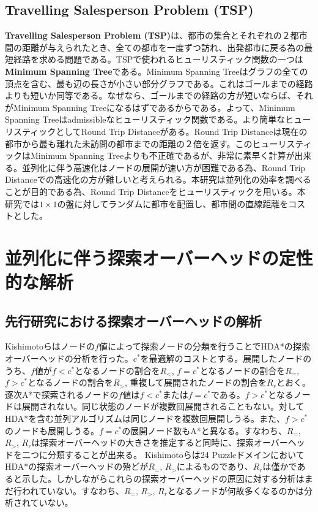 \documentclass[uplatex]{jsarticle}
\begin{document}
\subsection{Travelling Salesperson Problem (TSP)}
\textbf{Travelling Salesperson Problem (TSP)}は、都市の集合とそれぞれの２都市間の距離が与えられたとき、全ての都市を一度ずつ訪れ、出発都市に戻る為の最短経路を求める問題である。TSPで使われるヒューリスティック関数の一つは\textbf{Minimum Spanning Tree}である。Minimum Spanning Treeはグラフの全ての頂点を含む、最も辺の長さが小さい部分グラフである。これはゴールまでの経路よりも短いか同等である。なぜなら、ゴールまでの経路の方が短いならば、それがMinimum Spanning Treeになるはずであるからである。よって、Minimum Spanning Treeはadmissibleなヒューリスティック関数である。より簡単なヒューリスティックとしてRound Trip Distanceがある。Round Trip Distanceは現在の都市から最も離れた未訪問の都市までの距離の２倍を返す。このヒューリスティックはMinimum Spanning Treeよりも不正確であるが、非常に素早く計算が出来る。並列化に伴う高速化はノードの展開が速い方が困難である為、Round Trip Distanceでの高速化の方が難しいと考えられる。本研究は並列化の効率を調べることが目的である為、Round Trip Distanceをヒューリスティックを用いる。本研究では$1\times1$の盤に対してランダムに都市を配置し、都市間の直線距離をコストとした。

\newpage

\section{並列化に伴う探索オーバーヘッドの定性的な解析}
\label{sec:analysis1}

\subsection{先行研究における探索オーバーヘッドの解析}
Kishimotoらはノードの$f$値によって探索ノードの分類を行うことでHDA*の探索オーバーヘッドの分析を行った\cite{Kishimoto2013}。$c^*$を最適解のコストとする。展開したノードのうち、$f$値が$f < c^*$となるノードの割合を$R_{<}$, $f = c^*$となるノードの割合を$R_{=}$, $f > c^*$となるノードの割合を$R_{>}$, 重複して展開されたノードの割合を$R_{r}$とおく。逐次A*で探索されるノードの$f$値は$f < c^*$または$f = c^*$である。$f > c^*$となるノードは展開されない。同じ状態のノードが複数回展開されることもない。対してHDA*を含む並列アルゴリズムは同じノードを複数回展開しうる。また、$f > c^*$のノードも展開しうる。$f = c^*$の展開ノード数もA*と異なる。すなわち、$R_{=}$, $R_{>}$, $R_{r}$は探索オーバーヘッドの大きさを推定すると同時に、探索オーバーヘッドを二つに分類することが出来る。
Kishimotoらは24 PuzzleドメインにおいてHDA*の探索オーバーヘッドの殆どが$R_{=}$, $R_{>}$によるものであり、$R_{r}$は僅かであると示した。しかしながらこれらの探索オーバーヘッドの原因に対する分析はまだ行われていない。すなわち、$R_{=}$, $R_{>}$, $R_{r}$となるノードが何故多くなるのかは分析されていない。
\end{document}
